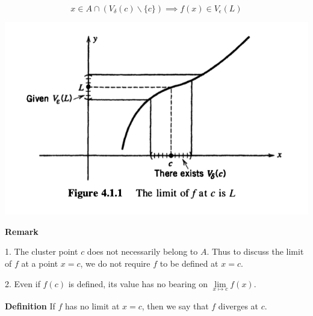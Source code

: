 \documentclass[10pt,landscape]{article}
\begin{document}
\begin{multicols}{4}
$$
x \in A \cap (V_{\delta}(c) \backslash \{ c \}) \implies f(x) \in V_{\epsilon}(L)
$$

\includegraphics[width=\columnwidth]{images/function-limits-definition.png}

\textbf{Remark}

1. The cluster point $c$ does not necessarily belong to $A$. Thus to discuss the limit of $f$ at a point $x = c$, we do not require $f$ to be defined at $x = c$.

2. Even if $f(c)$ is defined, its value has no bearing on $\underset{x \mapsto c}{\lim} f(x)$.

\textbf{Definition} If $f$ has no limit at $x = c$, then we say that $f$ diverges at $c$.










\end{multicols}
\end{document}
